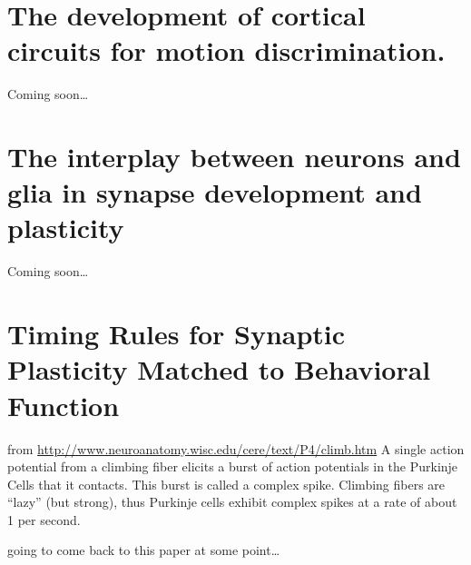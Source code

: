\documentclass[11pt, a4paper, oneside]{article}   	%
\begin{document}
\section{The development of cortical circuits for motion discrimination. \cite{Smith2015}}

Coming soon\ldots

\section{The interplay between neurons and glia in synapse development and plasticity \cite{Stogsdill2017}}

Coming soon\ldots

\section{Timing Rules for Synaptic Plasticity Matched to Behavioral Function \cite{Suvrathan2016}}
\label{MNCF:Suvrathan2016}

from \url{http://www.neuroanatomy.wisc.edu/cere/text/P4/climb.htm}
A single action potential from a climbing fiber elicits a burst of action potentials in the Purkinje Cells that it contacts. This burst is called a complex spike. Climbing fibers are ``lazy'' (but strong), thus Purkinje cells exhibit complex spikes at a rate of about 1 per second. 

going to come back to this paper at some point\ldots
\end{document}
